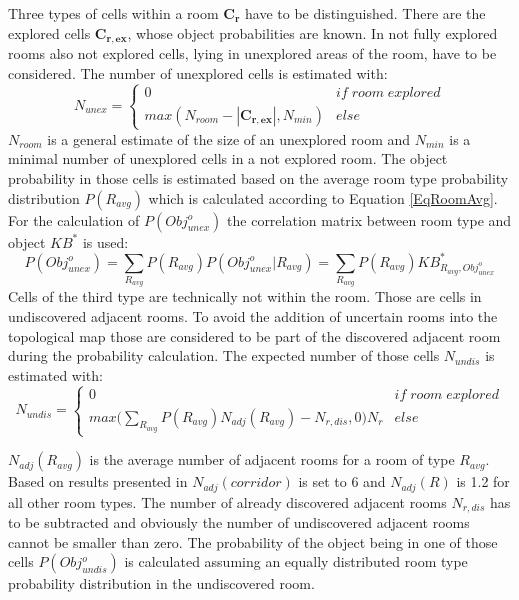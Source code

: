 Three types of cells within a room $\mathbf{C_r}$ have to be distinguished. There are the explored cells $\mathbf{C_{r,ex}}$, whose object probabilities are known. In not fully explored rooms also not explored cells, lying in unexplored areas of the room, have to be considered. The number of unexplored cells is estimated with:
\begin{equation}
 N_{unex} = \begin{cases} 0 & if \;room\; explored \\ max(N_{room}-|\mathbf{\mathbf{C_{r,ex}}}|, N_{min}) & else \end{cases}
\end{equation}
$N_{room}$ is a general estimate of the size of an unexplored room and $N_{min}$ is a minimal number of unexplored cells in a not explored room. The object probability in those cells is estimated based on the average room type probability distribution $P(R_{avg})$ which is calculated according to Equation \ref{EqRoomAvg}. For the calculation of $P(Obj_{unex}^o)$ the correlation matrix between room type and object $KB^*$ is used:
\begin{equation}
 P(Obj_{unex}^o) = \sum_{R_{avg}}P(R_{avg})P(Obj_{unex}^o|R_{avg}) = \sum_{R_{avg}}P(R_{avg})KB_{R_{avg},Obj_{unex}^o}^*
\end{equation}
Cells of the third type are technically not within the room. Those are cells in undiscovered adjacent rooms. To avoid the addition of uncertain rooms into the topological map those are considered to be part of the discovered adjacent room during the probability calculation. The expected number of those cells $N_{undis}$ is estimated with:
\begin{equation}
 N_{undis}=\begin{cases} 0 & if \;room\; explored \\ max\Big(\sum_{R_{avg}}P(R_{avg})N_{adj}(R_{avg})-N_{r,dis},0\Big)N_r & else \end{cases}
\end{equation} 

$N_{adj}(R_{avg})$ is the average number of adjacent rooms for a room of type $R_{avg}$. Based on results presented in \cite{main_phd} $N_{adj}(corridor)$ is set to 6 and $N_{adj}(R)$ is 1.2 for all other room types. The number of already discovered adjacent rooms $N_{r,dis}$ has to be subtracted and obviously the number of undiscovered adjacent rooms cannot be smaller than zero. The probability of the object being in one of those cells $P(Obj_{undis}^o)$ is calculated assuming an equally distributed room type probability distribution in the undiscovered room.

